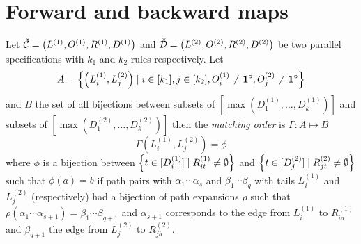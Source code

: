 
\label{ch:pbijection}



\section{Forward and backward maps}
\begin{definition}
Let $\check{\mathcal{C}} = \left(L^{(1)}, O^{(1)}, R^{(1)}, D^{(1)}\right)$ and $\check{\mathcal{D}} = \left(L^{(2)}, O^{(2)}, R^{(2)}, D^{(2)}\right)$ be two parallel specifications with $k_1$ and $k_2$ rules respectively. Let 
\[
A= \left\{\left(L^{(1)}_i,L^{(2)}_j\right) \mid i \in [k_1], j \in [k_2], O^{(1)}_i \neq \mathbf{1}^\circ, O^{(2)}_j \neq \mathbf{1}^\circ\right\}
\]
and $B$ the set of all bijections between subsets of $[\max(D^{(1)}_1,\dotsc,D^{(1)}_k)]$ and subsets of $[\max(D^{(2)}_1,\dotsc,D^{(2)}_k)]$
then the \emph{matching order} is $\Gamma: A \mapsto B$
\[
    \Gamma\left(L^{(1)}_i,L^{(2)}_j\right) = \phi
\]
where $\phi$ is a bijection between $\left\{t \in [D^{(1)}_i] \mid R^{(1)}_{it} \neq \emptyset\right\}$ and $\left\{t\in[D^{(2)}_j] \mid R^{(2)}_{jt} \neq \emptyset\right\}$
such that $\phi(a) = b$ if path pairs with $\alpha_1\dotsm\alpha_s$ and $\beta_1\dotsm\beta_q$ with tails $L^{(1)}_i$ and $L^{(2)}_j$ (respectively) had a bijection of path expansions $\rho$ such that $\rho(\alpha_1\dotsm\alpha_{s+1}) = \beta_1\dotsm\beta_{q+1}$ and  $\alpha_{s+1}$ corresponds to the edge from $L^{(1)}_i$ to $R^{(1)}_{ia}$ and $\beta_{q+1}$ the edge from $L^{(2)}_j$ to $R^{(2)}_{jb}$.
\end{definition}

